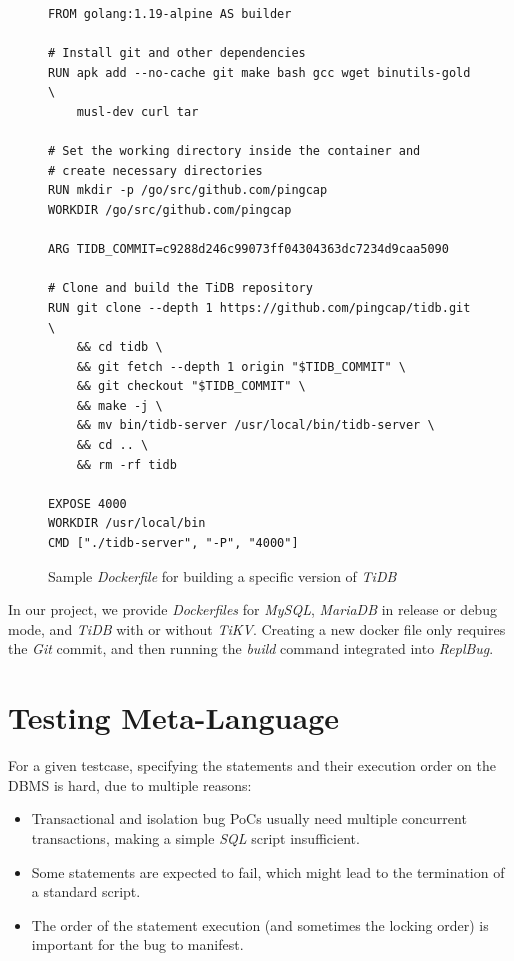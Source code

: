 \begin{figure}
\begin{verbatim}
FROM golang:1.19-alpine AS builder

# Install git and other dependencies
RUN apk add --no-cache git make bash gcc wget binutils-gold \
    musl-dev curl tar

# Set the working directory inside the container and
# create necessary directories
RUN mkdir -p /go/src/github.com/pingcap
WORKDIR /go/src/github.com/pingcap

ARG TIDB_COMMIT=c9288d246c99073ff04304363dc7234d9caa5090

# Clone and build the TiDB repository
RUN git clone --depth 1 https://github.com/pingcap/tidb.git \
    && cd tidb \
    && git fetch --depth 1 origin "$TIDB_COMMIT" \
    && git checkout "$TIDB_COMMIT" \
    && make -j \
    && mv bin/tidb-server /usr/local/bin/tidb-server \
    && cd .. \
    && rm -rf tidb

EXPOSE 4000
WORKDIR /usr/local/bin
CMD ["./tidb-server", "-P", "4000"]    
\end{verbatim}
\caption{Sample \textit{Dockerfile} for building a specific version of \textit{TiDB}}
\label{fig:dockerfilesample}
\end{figure}

In our project, we provide \textit{Dockerfiles} for \textit{MySQL}, \textit{MariaDB} in release or debug mode, and \textit{TiDB} with or without \textit{TiKV}. Creating a new docker file only requires the \textit{Git} commit, and then running the \textit{build} command integrated into \textit{ReplBug}. 

\section{Testing Meta-Language}

For a given testcase, specifying the statements and their execution order on the DBMS is hard, due to multiple reasons:
\begin{itemize}
    \item Transactional and isolation bug PoCs usually need multiple concurrent transactions, making a simple \textit{SQL} script insufficient.
    \item Some statements are expected to fail, which might lead to the termination of a standard script.
    \item The order of the statement execution (and sometimes the locking order) is important for the bug to manifest.
\end{itemize} 

